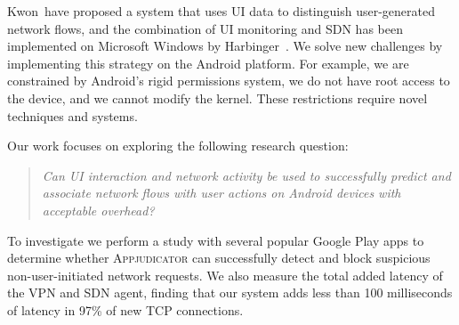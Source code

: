 Kwon~\etal have proposed a system that uses UI data to distinguish
user-generated network flows, and the combination of UI monitoring and SDN has
been implemented on Microsoft Windows by Harbinger~\cite{chuluundorj2019}.  We
solve new challenges by implementing this strategy on the Android platform. For
example, we are constrained by Android's rigid permissions system, we do not
have root access to the device, and we cannot modify the kernel. These
restrictions require novel techniques and systems.

Our work focuses on exploring the following research question: 
\begin{quote}
	\textit{Can UI interaction and network activity be used to successfully
		predict and associate network flows with user actions on Android devices
		with acceptable overhead?}
\end{quote}

To investigate we perform a study with several popular Google Play apps to
determine whether \textsc{Appjudicator} can successfully detect and block
suspicious non-user-initiated network requests. %
We also measure the total added latency of the VPN and SDN agent, finding that
our system adds less than 100 milliseconds of latency in 97\% of new TCP
connections.

\newpage
